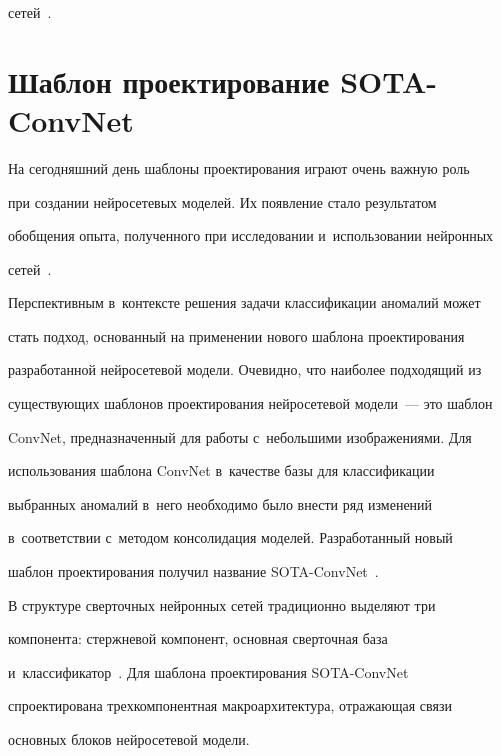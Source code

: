 сетей~\cite{9-ar}.





\section{Шаблон проектирование SOTA-ConvNet}





  На сегодняшний день шаблоны проектирования играют очень важную роль 


при создании нейросетевых моделей. Их появление стало результатом 


обобщения опыта, полученного при исследовании и~использовании нейронных 


сетей~\cite{9-ar}.


  


  Перспективным в~контексте решения задачи классификации аномалий может 


стать подход, основанный на применении нового шаблона проектирования 


разработанной нейросетевой модели. Очевидно, что наиболее подходящий из 


существующих шаблонов проектирования нейросетевой модели~--- это шаблон 


ConvNet, предназначенный для работы с~небольшими изображениями. Для 


использования шаблона ConvNet в~качестве базы для классификации 


выбранных аномалий в~него необходимо было внести ряд изменений 


в~соответствии с~методом консолидация моделей. Разработанный новый 


шаблон проектирования получил название SOTA-ConvNet~\cite{14-ar}.


  


  В структуре сверточных нейронных сетей традиционно выделяют три 


компонента: стержневой компонент, основная сверточная база 


и~классификатор~\cite{9-ar}. Для шаблона проектирования SOTA-ConvNet 


спроектирована трехкомпонентная макроархитектура, отражающая связи 


основных блоков нейросетевой модели.


  


